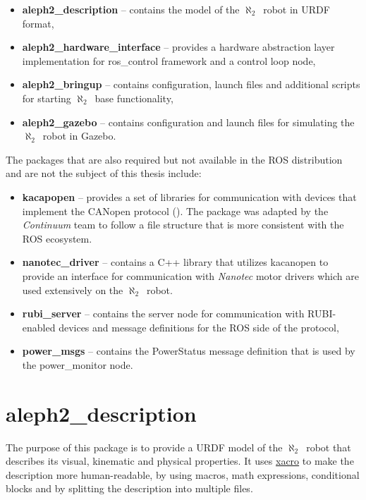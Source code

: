 \documentclass[english,inz,shortabstract]{iithesis}
\newcommand{\val}[1]{\textbf{\textsf{#1}}}
\newcommand{\rovername}{$\aleph_2$\ }
\begin{document}
	\begin{itemize}
		\item \val{aleph2\_description} -- 
		contains the model of the \rovername robot in URDF format,
		\item \val{aleph2\_hardware\_interface} -- 
		provides a hardware abstraction layer implementation for \textsf{ros\_control} framework and a control loop node,
		\item \val{aleph2\_bringup} -- 
		contains configuration, launch files and additional scripts for starting \rovername base functionality,
		\item \val{aleph2\_gazebo} -- 
		contains configuration and launch files for simulating the \rovername robot in Gazebo.
	\end{itemize}

	The packages that are also required but not available in the ROS distribution and are not the subject of this thesis include:

	\begin{itemize}
		\item \val{kacapopen} -- provides a set of libraries for communication with devices that implement the CANopen protocol (\cite{kacanopen2016}). The package was adapted by the \textit{Continuum} team to follow a file structure that is more consistent with the ROS ecosystem. 
		\item \val{nanotec\_driver} -- contains a C++ library that utilizes \textsf{kacanopen} to provide an interface for communication with \textit{Nanotec} motor drivers which are used extensively on the \rovername robot.
		\item \val{rubi\_server} -- contains the server node for communication with RUBI-enabled devices and message definitions for the ROS side of the protocol,
		\item \val{power\_msgs} -- contains the \textsf{PowerStatus} message definition that is used by the \textsf{power\_monitor} node.
	\end{itemize}


\section{aleph2\_description}

	The purpose of this package is to provide a URDF model of the \rovername robot that describes its visual, kinematic and physical properties. It uses \href{http://wiki.ros.org/xacro}{\textsf{xacro}} to make the description more human-readable, by using macros, math expressions, conditional blocks and by splitting the description into multiple files. 
\end{document}
